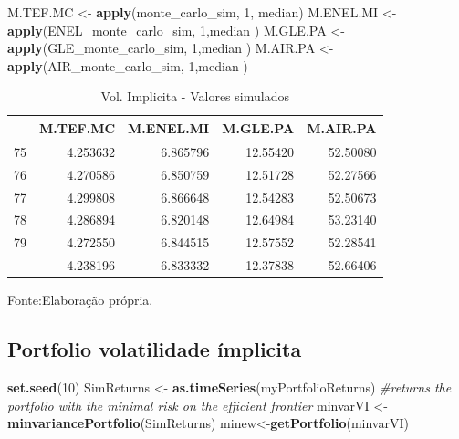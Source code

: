 \documentclass[
  12pt,
  a4paper,
  openany]{book}
\newenvironment{Shaded}{\begin{snugshade}}{\end{snugshade}}
\newcommand{\CommentTok}[1]{\textcolor[rgb]{0.56,0.35,0.01}{\textit{#1}}}
\newcommand{\DecValTok}[1]{\textcolor[rgb]{0.00,0.00,0.81}{#1}}
\newcommand{\KeywordTok}[1]{\textcolor[rgb]{0.13,0.29,0.53}{\textbf{#1}}}
\newcommand{\NormalTok}[1]{#1}
\newcommand{\StringTok}[1]{\textcolor[rgb]{0.31,0.60,0.02}{#1}}
\begin{document}
\scriptsize

\begin{Shaded}
\begin{Highlighting}[]
\NormalTok{M.TEF.MC \textless{}{-}}\StringTok{ }\KeywordTok{apply}\NormalTok{(monte\_carlo\_sim, }\DecValTok{1}\NormalTok{, median)}
\NormalTok{M.ENEL.MI \textless{}{-}}\StringTok{ }\KeywordTok{apply}\NormalTok{(ENEL\_monte\_carlo\_sim, }\DecValTok{1}\NormalTok{,median )}
\NormalTok{M.GLE.PA \textless{}{-}}\StringTok{ }\KeywordTok{apply}\NormalTok{(GLE\_monte\_carlo\_sim, }\DecValTok{1}\NormalTok{,median )}
\NormalTok{M.AIR.PA \textless{}{-}}\StringTok{ }\KeywordTok{apply}\NormalTok{(AIR\_monte\_carlo\_sim, }\DecValTok{1}\NormalTok{,median )}
\end{Highlighting}
\end{Shaded}

\normalsize
\begin{table}[!h]

\caption{\label{tab:unnamed-chunk-62}Vol. Implicita - Valores simulados}
\centering
\begin{tabular}[t]{lrrrr}
\toprule
  & M.TEF.MC & M.ENEL.MI & M.GLE.PA & M.AIR.PA\\
\midrule
75 & 4.253632 & 6.865796 & 12.55420 & 52.50080\\
76 & 4.270586 & 6.850759 & 12.51728 & 52.27566\\
77 & 4.299808 & 6.866648 & 12.54283 & 52.50673\\
78 & 4.286894 & 6.820148 & 12.64984 & 53.23140\\
79 & 4.272550 & 6.844515 & 12.57552 & 52.28541\\
\addlinespace
80 & 4.238196 & 6.833332 & 12.37838 & 52.66406\\
\bottomrule
\end{tabular}
\end{table}
\FloatBarrier
\centering

Fonte:Elaboração própria.

\justifying
\bigskip

\hypertarget{portfolio-volatilidade-uxedmplicita}{%
\subsection{Portfolio volatilidade ímplicita}\label{portfolio-volatilidade-uxedmplicita}}

\scriptsize

\begin{Shaded}
\begin{Highlighting}[]
\KeywordTok{set.seed}\NormalTok{(}\DecValTok{10}\NormalTok{)}
\NormalTok{SimReturns \textless{}{-}}\StringTok{ }\KeywordTok{as.timeSeries}\NormalTok{(myPortfolioReturns)}
\CommentTok{\#returns the portfolio with the minimal risk on the efficient frontier}
\NormalTok{minvarVI \textless{}{-}}\StringTok{ }\KeywordTok{minvariancePortfolio}\NormalTok{(SimReturns) }
\NormalTok{minew\textless{}{-}}\KeywordTok{getPortfolio}\NormalTok{(minvarVI)}
\end{Highlighting}
\end{Shaded}
\end{document}
